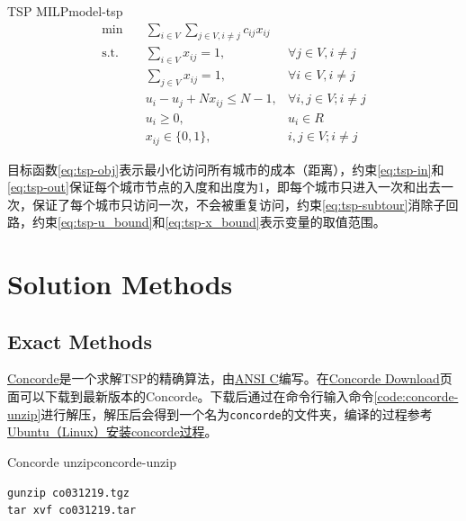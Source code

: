 \begin{model}{TSP MILP}{model-tsp}
\begin{align}
    \min \quad & \sum_{i \in V}\sum_{j \in V, i \neq j} c_{ij}x_{ij} & \label{eq:tsp-obj}\\
    \text{s.t.} \quad & \sum_{i \in V} x_{ij} = 1, & \forall j \in V, i \neq j\label{eq:tsp-in}\\
    \quad & \sum_{j \in V} x_{ij} = 1, & \forall i \in V, i \neq j \label{eq:tsp-out}\\
    \quad & u_i - u_j + Nx_{ij} \leq N - 1, & \forall i, j \in V; i \neq j \label{eq:tsp-subtour}\\
    \quad & u_i \geq 0, & u_i \in R \label{eq:tsp-u_bound}\\
    \quad & x_{ij} \in \{0, 1\}, & i, j \in V; i \neq j\label{eq:tsp-x_bound}
\end{align}
\end{model}

目标函数\ref{eq:tsp-obj}表示最小化访问所有城市的成本（距离），约束\ref{eq:tsp-in}和\ref{eq:tsp-out}保证每个城市节点的入度和出度为1，即每个城市只进入一次和出去一次，保证了每个城市只访问一次，不会被重复访问，约束\ref{eq:tsp-subtour}消除子回路，约束\ref{eq:tsp-u_bound}和\ref{eq:tsp-x_bound}表示变量的取值范围。

\section{Solution Methods}

\subsection{Exact Methods}
\href{https://www.math.uwaterloo.ca/tsp/concorde/index.html}{Concorde}是一个求解TSP的精确算法，由\href{https://www.wikiwand.com/en/articles/ANSI_C}{ANSI C}编写。在\href{https://www.math.uwaterloo.ca/tsp/concorde/downloads/downloads.htm}{Concorde Download}页面可以下载到最新版本的Concorde。下载后通过在命令行输入命令\ref{code:concorde-unzip}进行解压，解压后会得到一个名为\texttt{concorde}的文件夹，编译的过程参考\href{https://www.freesion.com/article/5581560004/}{Ubuntu（Linux）安装concorde过程}。

\begin{code}{Concorde unzip}{concorde-unzip}
\begin{verbatim}
gunzip co031219.tgz
tar xvf co031219.tar
\end{verbatim}
\end{code}

